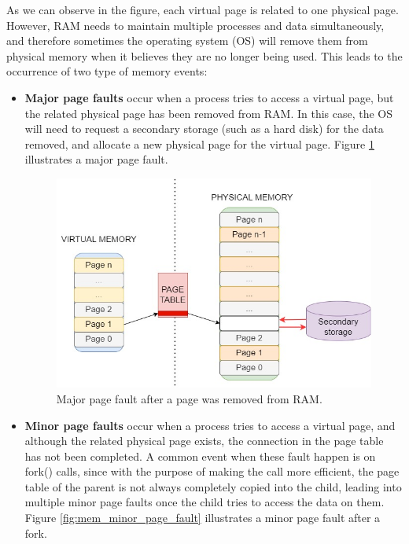 \documentclass[12pt]{report} %
\begin{document}
As we can observe in the figure, each virtual page is related to one physical page. However, RAM needs to maintain multiple processes and data simultaneously, and therefore sometimes the operating system (OS) will remove them from physical memory when it believes they are no longer being used. This leads to the occurrence of two type of memory events\cite{page_faults}:
\begin{itemize}
\item \textbf{Major page faults} occur when a process tries to access a virtual page, but the related physical page has been removed from RAM. In this case, the OS will need to request a secondary storage (such as a hard disk) for the data removed, and allocate a new physical page for the virtual page. Figure \ref{fig:mem_major_page_fault} illustrates a major page fault.
\begin{figure}[H]
	\centering
	\includegraphics[width=11cm]{mem_major_page_fault.jpg}
	\caption{Major page fault after a page was removed from RAM.}
	\label{fig:mem_major_page_fault}
\end{figure}
\item \textbf{Minor page faults} occur when a process tries to access a virtual page, and although the related physical page exists, the connection in the page table has not been completed. A common event when these fault happen is on fork() calls, since with the purpose of making the call more efficient, the page table of the parent is not always completely copied into the child, leading into multiple minor page faults once the child tries to access the data on them. Figure \ref{fig:mem_minor_page_fault} illustrates a minor page fault after a fork.
\end{itemize}
\end{document}
